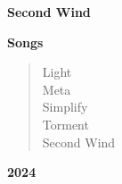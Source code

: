 
\begin{center}
    \vspace*{2cm}
    \Huge
    \textbf{Second Wind}

    \vspace{1cm}
    \Large
    \textbf{Songs}

    \begin{verse}
    Light \\
    Meta \\
    Simplify \\
    Torment \\
    Second Wind \\
    \end{verse}

    \vspace*{\fill}
    \large
    \textbf{2024}
    \vspace{1cm}
\end{center}

\clearpage